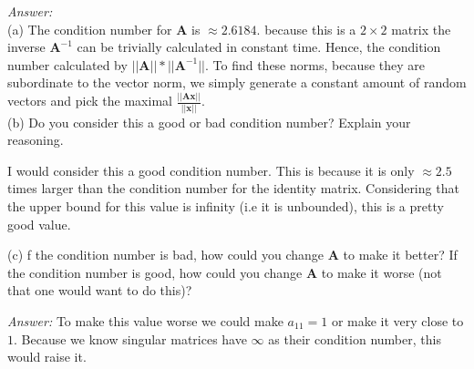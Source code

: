 \documentclass{article}
\begin{document}
    \vspace{0.5cm}
    \textit{Answer:} \\
    (a) The condition number for $\bm{A}$ is $\approx 2.6184$.
    because this is a $2\times 2$ matrix the inverse $\bm{A}^{-1}$ can be trivially
    calculated in constant time. Hence, the condition number calculated by
    $||\bm{A}||*||\bm{A}^{-1}||$. To find these norms, because they are subordinate
    to the vector norm, we simply generate a constant amount of random vectors and 
    pick the maximal $\frac{||\bm{A}\bm{x}||}{||\bm{x}||}$. \\
    (b) Do you consider this a good or bad condition number?
    Explain your reasoning.

    \vspace{0.5cm}
    I would consider this a good condition number. This is because it is only $\approx 2.5$
    times larger than the condition number for the identity matrix. Considering that the
    upper bound for this value is infinity (i.e it is unbounded), this is a pretty good value.

    \vspace{1cm}
    (c) f the condition number is bad, how could you change $\bm{A}$ to make it better? If the 
    condition number is good, how could you change $\bm{A}$ to make it worse (not that one 
    would want to do this)?

    \vspace{0.5cm}
    \textit{Answer:} To make this value worse we could make $a_{11} = 1$ or make 
    it very close to $1$. Because we know singular matrices have $\infty$ as their condition
    number, this would raise it. 
\end{document}
